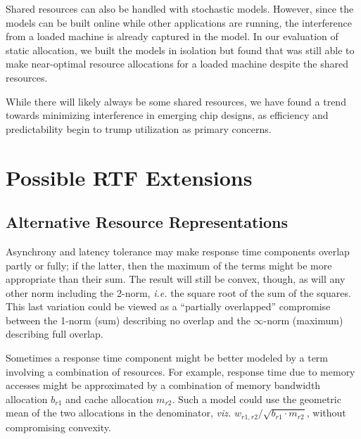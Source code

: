 Shared resources can also be handled with stochastic models.  However, since the models can be built online while other applications are running, the interference from a loaded machine is already captured in the model.  In our evaluation of static allocation, we built the models in isolation but found that \pacora was still able to make near-optimal resource allocations for a loaded machine despite the shared resources.

While there will likely always be some shared resources, we have found
a trend towards minimizing interference in emerging chip designs, as
efficiency and predictability begin to trump utilization as primary
concerns.






\section{Possible RTF Extensions}
\subsection{Alternative Resource Representations}
Asynchrony and latency tolerance may make response time components overlap partly or fully;
if the latter, then the maximum of the terms might be more appropriate than their sum.
The result will still be convex, though, as will any other norm including the 2-norm,
\emph{i.e.} the square root of the sum of the squares.
This last variation could be viewed as a ``partially overlapped'' compromise between
the 1-norm (sum) describing no overlap and the $\infty$-norm (maximum) describing full overlap.

Sometimes a response time component might be better modeled by a term involving a combination of resources.
For example, response time due to memory accesses might be approximated
by a combination of memory bandwidth allocation $b_{r1}$ and cache allocation $m_{r2}$.
Such a model could use the geometric mean of the two allocations in the denominator,
\emph{viz.} $w_{r1,r2}/\sqrt{b_{r1}\cdot m_{r2}}$, without compromising convexity.

